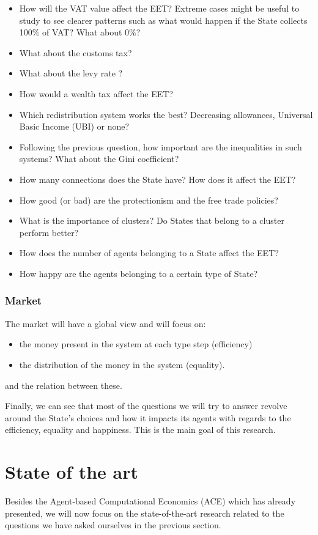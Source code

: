 \documentclass[20pt]{article}
\begin{document}
\begin{itemize}
    \item How will the VAT value affect the EET? Extreme cases might be useful to study to see clearer patterns such as what would happen if the State collects 100\% of VAT? What about 0\%?
    \item What about the customs tax?
    \item What about the levy rate ?
    \item How would a wealth tax affect the EET?
    \item Which redistribution system works the best? Decreasing allowances, Universal Basic Income (UBI) or none?
    \item Following the previous question, how important are the inequalities in such systems? What about the Gini coefficient? 
    \item How many connections does the State have? How does it affect the EET?
    \item How good (or bad) are the protectionism and the free trade policies?
    \item What is the importance of clusters? Do States that belong to a cluster perform better?
    \item How does the number of agents belonging to a State affect the EET?
    \item How happy are the agents belonging to a certain type of State?
\end{itemize}

\subsubsection{Market}
The market will have a global view and will focus on:

\begin{itemize}
    \item the money present in the system at each type step (efficiency)
    \item the distribution of the money in the system (equality).
\end{itemize}

and the relation between these.

Finally, we can see that most of the questions we will try to answer revolve around the State's choices and how it impacts its agents with regards to the efficiency, equality and happiness. This is the main goal of this research.

\section{State of the art}\label{section:state_of_the_art}
Besides the Agent-based Computational Economics (ACE) which has already presented, we will now focus on the state-of-the-art research related to the questions we have asked ourselves in the previous section.
\end{document}
